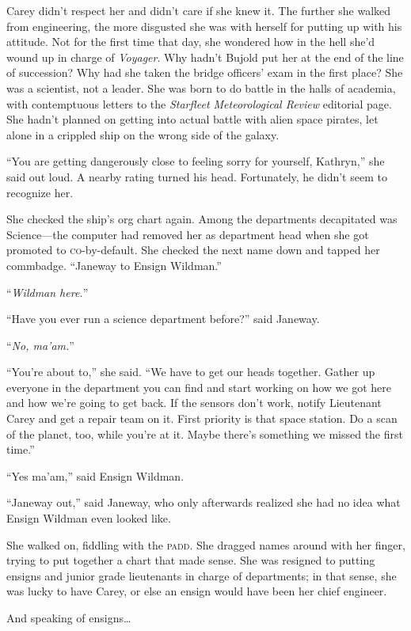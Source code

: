 \documentclass[twoside,letterpaper,12pt]{memoir}
\begin{document}
Carey didn't respect her and didn't care if she knew it. The further she walked from engineering, the more disgusted she was with herself for putting up with his attitude. Not for the first time that day, she wondered how in the hell she'd wound up in charge of \textit{Voyager}. Why hadn't Bujold put her at the end of the line of succession? Why had she taken the bridge officers' exam in the first place? She was a scientist, not a leader. She was born to do battle in the halls of academia, with contemptuous letters to the \textit{Starfleet Meteorological Review} editorial page. She hadn't planned on getting into actual battle with alien space pirates, let alone in a crippled ship on the wrong side of the galaxy.

``You are getting dangerously close to feeling sorry for yourself, Kathryn,'' she said out loud. A nearby rating turned his head. Fortunately, he didn't seem to recognize her.

She checked the ship's org chart again. Among the departments decapitated was Science---the computer had removed her as department head when she got promoted to \textsc{co}-by-default. She checked the next name down and tapped her commbadge. ``Janeway to Ensign Wildman.''

``\textit{Wildman here.}''

``Have you ever run a science department before?'' said Janeway.

``\textit{No, ma'am.}''

``You're about to,'' she said. ``We have to get our heads together. Gather up everyone in the department you can find and start working on how we got here and how we're going to get back. If the sensors don't work, notify Lieutenant Carey and get a repair team on it. First priority is that space station. Do a scan of the planet, too, while you're at it. Maybe there's something we missed the first time.''

``Yes ma'am,'' said Ensign Wildman.

``Janeway out,'' said Janeway, who only afterwards realized she had no idea what Ensign Wildman even looked like.

She walked on, fiddling with the \textsc{padd}. She dragged names around with her finger, trying to put together a chart that made sense. She was resigned to putting ensigns and junior grade lieutenants in charge of departments; in that sense, she was lucky to have Carey, or else an ensign would have been her chief engineer.

And speaking of ensigns\ldots 
\end{document}
